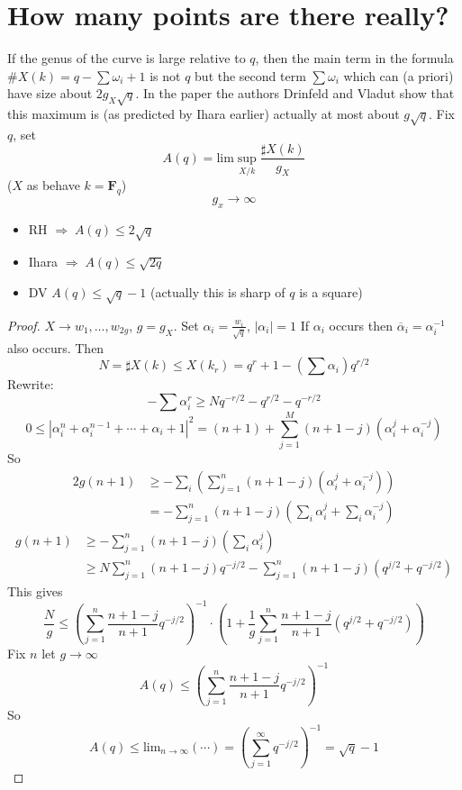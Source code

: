 \section{How many points are there really?}
\label{section-really}

\noindent
If the genus of the curve is large relative to $q$, then the main
term in the formula $\#X(k) = q - \sum \omega_i + 1$ is not $q$
but the second term $\sum \omega_i$ which can (a priori) have
size about $2g_X\sqrt{q}$. In the paper \cite{Drinfeld-number}
the authors Drinfeld and Vladut show that this maximum is (as predicted
by Ihara earlier) actually at most about $g\sqrt{q}$. Fix $q$, 
set
	$$A(q) = \text{lim}\sup_{X/k} \frac{\sharp X(k)}{g_X}$$
	($X$ as behave $k=\mathbf{F}_q$)
	$$g_x\to \infty$$
	\begin{itemize}
	\item RH $\Rightarrow\; A(q)\leq 2\sqrt q$
	\item Ihara $\Rightarrow\; A(q)\leq \sqrt{2q}$
	\item DV $A(q)\leq \sqrt q-1$ (actually this is sharp of $q$ is a 
square)
	\end{itemize}
	
\begin{proof} $X\to w_1, \ldots, w_{2g}$, $g=g_{X}$. Set 
$\alpha_i=\frac{w_i}{\sqrt q}$, $|\alpha_i|=1$ If $\alpha_i$ occurs then 
$\overline{\alpha}_i=\alpha_i^{-1}$ also occurs. Then
	$$N=\sharp X(k)\leq X(k_r)=q^r+1-(\sum\alpha_i)q^{r/2}$$
Rewrite:
	$$-\sum\alpha_i^r\geq Nq^{-r/2}-q^{r/2}-q^{-r/2}$$
	$$0\leq |\alpha_i^n +\alpha_i^{n-1} +\cdots +\alpha_i +1|^2 
=(n+1)+\sum_{j=1}^M(n+1-j)(\alpha_i^j+\alpha_i^{-j})$$
	So
	\begin{align*}
	2g(n+1) &\geq -\sum_i \left(\sum_{j=1}^n (n+1-j)(\alpha_i^j 
+\alpha_i^{-j})\right)\\
	&=-\sum_{j=1}^n (n+1-j)\left(\sum_i\alpha_i^j 
+\sum_i\alpha_i^{-j}\right)
	\end{align*}
	\begin{align*}
	g(n+1)&\geq -\sum_{j=1}^n (n+1-j)(\sum_i\alpha_i^j)\\
	&\geq N\sum_{j=1}^n (n+1-j)q^{-j/2}-\sum_{j=1}^n 
(n+1-j)(q^{j/2}+q^{-j/2})\end{align*}
	This gives
	$$\frac{N}{g}\leq \left(\sum_{j=1}^n \frac{n+1-j}{n+1}q^{-j/2} 
\right)^{-1}\cdot\left(1+\frac{1}{g}\sum_{j=1}^n\frac{n+1-j}{n+1}(q^{j/2}+q^{-j/
2})\right)$$
	Fix $n$ let $g\to \infty$
	$$A(q)\leq \left(\sum_{j=1}^n \frac{n+1-j}{n+1}q^{-j/2}\right)^{-1}$$
	So 
	$$A(q)\leq \text{lim}_{n\to\infty}(\cdots) = \left(\sum_{j=1}^\infty 
q^{-j/2}\right)^{-1}=\sqrt q-1$$
\end{proof}







